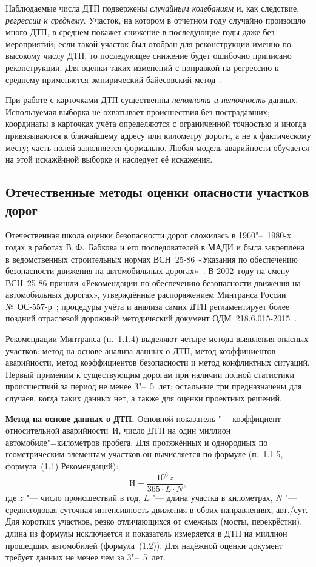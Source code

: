 \documentclass[coursework]{SCWorks}
\begin{document}
Наблюдаемые числа ДТП подвержены \emph{случайным колебаниям}
и, как следствие, \emph{регрессии к среднему}. Участок, на котором в
отчётном году случайно произошло много ДТП, в среднем покажет
снижение в последующие годы даже без мероприятий; если такой участок был
отобран для реконструкции именно по высокому числу ДТП, то последующее
снижение будет ошибочно приписано реконструкции. Для оценки таких
изменений с поправкой на регрессию к среднему применяется
эмпирический байесовский метод~\cite{hauer1997}.

При работе с карточками ДТП существенны \emph{неполнота и неточность} данных.
Используемая выборка не охватывает происшествия без пострадавших;
координаты в карточках учёта определяются с ограниченной
точностью и иногда привязываются к ближайшему адресу или километру
дороги, а не к фактическому месту; часть полей заполняется
формально. Любая модель аварийности обучается на этой искажённой
выборке и наследует её искажения.

\subsection{Отечественные методы оценки опасности участков дорог}

Отечественная школа оценки безопасности дорог сложилась в 1960"--~1980-х
годах в работах В.\,Ф.~Бабкова и его последователей в МАДИ и была
закреплена в ведомственных строительных нормах ВСН~25-86 «Указания по
обеспечению безопасности движения на автомобильных
дорогах»~\cite{babkov1993,vsn2586}. В 2002~году на смену ВСН~25-86
пришли «Рекомендации по обеспечению безопасности движения на
автомобильных дорогах», утверждённые распоряжением Минтранса России
№~ОС-557-р~\cite{mintrans2002}; процедуры учёта и анализа самих ДТП
регламентирует более поздний отраслевой дорожный методический документ
ОДМ~218.6.015-2015~\cite{odm2015}.

Рекомендации Минтранса (п.~1.1.4) выделяют четыре метода выявления
опасных участков: метод на основе анализа данных о ДТП, метод
коэффициентов аварийности, метод коэффициентов безопасности и метод
конфликтных ситуаций. Первый применим к существующим дорогам при наличии
полной статистики происшествий за период не менее 3"--~5~лет; остальные
три предназначены для случаев, когда таких данных нет, а также для
оценки проектных решений.

\textbf{Метод на основе данных о ДТП.} Основной показатель "---
коэффициент относительной аварийности~$\mathit{И}$, число ДТП на один
миллион автомобиле"=километров пробега. Для протяжённых и однородных по
геометрическим элементам участков он вычисляется по формуле
(п.~1.1.5, формула~(1.1) Рекомендаций):
\begin{equation}
  \mathit{И} = \frac{10^{6}\, z}{365 \cdot L \cdot N},
  \label{eq:rel_accident_rate}
\end{equation}
где $z$ "--- число происшествий в год, $L$ "--- длина участка в
километрах, $N$ "--- среднегодовая суточная интенсивность движения в
обоих направлениях, авт./сут. Для коротких участков, резко отличающихся
от смежных (мосты, перекрёстки), длина из формулы исключается и
показатель измеряется в ДТП на миллион прошедших автомобилей
(формула~(1.2)). Для надёжной оценки документ требует данных
не менее чем за 3"--~5~лет.
\end{document}
